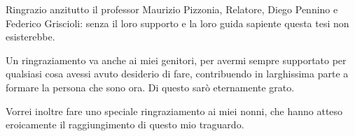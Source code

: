 \medskip
\medskip
Ringrazio anzitutto il professor Maurizio Pizzonia, Relatore, Diego Pennino e Federico Griscioli: senza il loro supporto e la loro guida sapiente questa tesi non esisterebbe.

\medskip
\medskip
Un ringraziamento va anche ai miei genitori, per avermi sempre supportato per qualsiasi cosa avessi avuto desiderio di fare, contribuendo in larghissima parte a formare la persona che sono ora. Di questo sarò eternamente grato.

\medskip
\medskip
Vorrei inoltre fare uno speciale ringraziamento ai miei nonni, che hanno atteso eroicamente il raggiungimento di questo mio traguardo.

